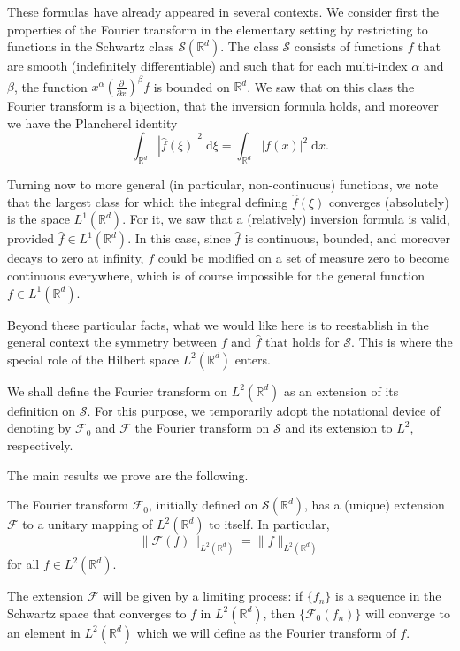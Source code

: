 \documentclass[lang=cn,newtx,10pt,scheme=chinese,device=pad]{elegantbook}
\newcommand{\dd}{\;\mathrm{d}}
\begin{document}
These formulas have already appeared in several contexts.
We consider first the properties of the Fourier transform in the elementary setting 
by restricting to functions in the Schwartz class $\mathcal S(\mathbb R^d)$.
The class $\mathcal S$ consists of functions $f$ that are smooth (indefinitely differentiable)
and such that for each multi-index $\alpha$ and $\beta$, the function $x^\alpha\left(\frac{\partial}{\partial x} \right)^\beta f$ is bounded on $\mathbb R^d$.
We saw that on this class the Fourier transform is a bijection,
that the inversion formula holds,
and moreover we have the Plancherel identity 
\begin{equation}
  \int_{\mathbb R^d}|\hat f(\xi)|^2\dd\xi = \int_{\mathbb R^d}|f(x)|^2\dd x.
\end{equation}

Turning now to more general (in particular, non-continuous) functions,
we note that the largest class for which the integral defining $\hat f(\xi)$ converges (absolutely) is the space $L^1(\mathbb R^d)$. 
For it, we saw that a (relatively) inversion formula is valid, 
provided $\hat f\in L^1(\mathbb R^d)$. 
In this case, 
since $\hat f$ is continuous, bounded, and moreover decays to zero at infinity,
$f$ could be modified on a set of measure zero to become continuous everywhere,
which is of course impossible for the general function $f\in L^1(\mathbb R^d)$.

Beyond these particular facts, what we would like here is to reestablish in the general context the symmetry between $f$ and $\hat f$ that holds for $\mathcal S$.
This is where the special role of the Hilbert space $L^2(\mathbb R^d)$ enters.

We shall define the Fourier transform on $L^2(\mathbb R^d)$ as an extension of its definition on $\mathcal S$.
For this purpose, we temporarily adopt the notational device of denoting by $\mathcal F_0$ and $\mathcal F$ the Fourier transform on $\mathcal S$ and its extension to $L^2$, respectively.

The main results we prove are the following.

\begin{theorem}
  The Fourier transform $\mathcal F_0$, initially defined on $\mathcal S(\mathbb R^d)$,
  has a (unique) extension $\mathcal F$ to a unitary mapping of $L^2(\mathbb R^d)$ to itself.
  In particular,
  \[
  \|\mathcal F(f)\|_{L^2(\mathbb R^d)} = \|f\|_{L^2(\mathbb R^d)}
  \]
  for all $f\in L^2(\mathbb R^d)$.
\end{theorem}

The extension $\mathcal F$ will be given by a limiting process: if $\{f_n\}$ is a sequence in the Schwartz space that converges to $f$ in $L^2(\mathbb R^d)$, 
then $\{\mathcal F_0(f_n)\}$ will converge to an element in $L^2(\mathbb R^d)$ which we will define as the Fourier transform of $f$.
\end{document}
